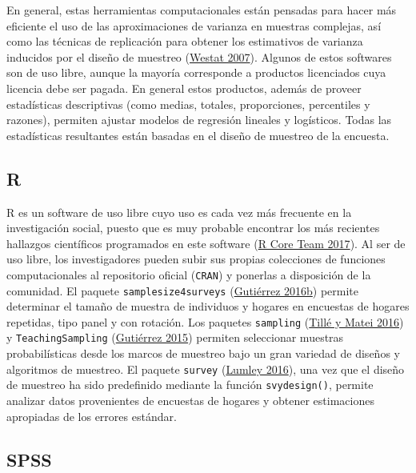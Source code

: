 \documentclass[
  12pt,
  spanish,
]{book}
\begin{document}
En general, estas herramientas computacionales están pensadas para hacer más eficiente el uso de las aproximaciones de varianza en muestras complejas, así como las técnicas de replicación para obtener los estimativos de varianza inducidos por el diseño de muestreo (\protect\hyperlink{ref-Westat_2007}{Westat 2007}). Algunos de estos softwares son de uso libre, aunque la mayoría corresponde a productos licenciados cuya licencia debe ser pagada. En general estos productos, además de proveer estadísticas descriptivas (como medias, totales, proporciones, percentiles y razones), permiten ajustar modelos de regresión lineales y logísticos. Todas las estadísticas resultantes están basadas en el diseño de muestreo de la encuesta.

\hypertarget{r}{%
\subsection*{R}\label{r}}

R es un software de uso libre cuyo uso es cada vez más frecuente en la investigación social, puesto que es muy probable encontrar los más recientes hallazgos científicos programados en este software (\protect\hyperlink{ref-R_2017}{R Core Team 2017}). Al ser de uso libre, los investigadores pueden subir sus propias colecciones de funciones computacionales al repositorio oficial (\texttt{CRAN}) y ponerlas a disposición de la comunidad. El paquete \texttt{samplesize4surveys} (\protect\hyperlink{ref-ss4s}{Gutiérrez 2016b}) permite determinar el tamaño de muestra de individuos y hogares en encuestas de hogares repetidas, tipo panel y con rotación. Los paquetes \texttt{sampling} (\protect\hyperlink{ref-Yves}{Tillé y Matei 2016}) y \texttt{TeachingSampling} (\protect\hyperlink{ref-TS}{Gutiérrez 2015}) permiten seleccionar muestras probabilísticas desde los marcos de muestreo bajo un gran variedad de diseños y algoritmos de muestreo. El paquete \texttt{survey} (\protect\hyperlink{ref-TL}{Lumley 2016}), una vez que el diseño de muestreo ha sido predefinido mediante la función \texttt{svydesign()}, permite analizar datos provenientes de encuestas de hogares y obtener estimaciones apropiadas de los errores estándar.

\hypertarget{spss}{%
\subsection*{SPSS}\label{spss}}
\end{document}

